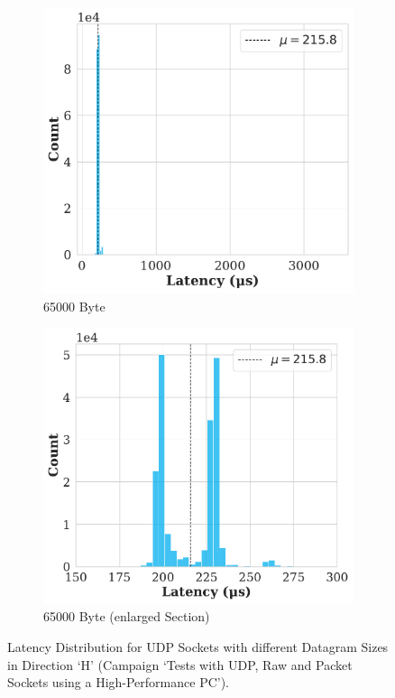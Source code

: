 \begin{figure}[h!]
  \begin{subfigure}[b]{0.45\linewidth}
    \includegraphics[width=\linewidth]{figures/performance/d_4c.pdf}
    \caption{65000 Byte}
    \label{fig:histFrag:c}
  \end{subfigure}
  \hfill
  \begin{subfigure}[b]{0.45\linewidth}
    \includegraphics[width=\linewidth]{figures/performance/d_4d.pdf}
    \caption{65000 Byte (enlarged Section)}
    \label{fig:histFrag:d}
  \end{subfigure}
  
  \caption{Latency Distribution for UDP Sockets with different Datagram Sizes in Direction `H' (Campaign `Tests with UDP, Raw and Packet Sockets using a High-Performance PC').}
  \label{fig:histFrag}
\end{figure}

